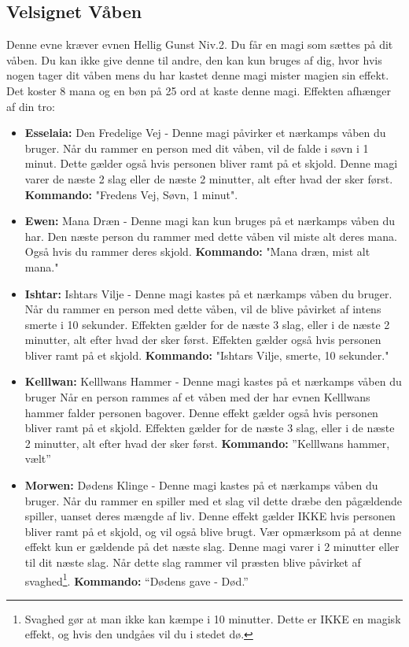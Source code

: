 \subsection{Velsignet Våben}
Denne evne kræver evnen Hellig Gunst Niv.2. 
Du får en magi som sættes på dit våben. Du kan ikke give denne til andre, den kan kun bruges af dig, hvor hvis nogen tager dit våben mens du har kastet denne magi mister magien sin effekt. Det koster 8 mana og en bøn på 25 ord at kaste denne magi. Effekten afhænger af din tro:
\begin{itemize}
    \item \textbf{Esselaia:} Den Fredelige Vej - Denne magi påvirker et nærkamps våben du bruger. Når du rammer en person med dit våben, vil de falde i søvn i 1 minut. Dette gælder også hvis personen bliver ramt på et skjold. Denne magi varer de næste 2 slag eller de næste 2 minutter, alt efter hvad der sker først. \textbf{Kommando:} "Fredens Vej, Søvn, 1 minut".
    \item \textbf{Ewen:} Mana Dræn - Denne magi kan kun bruges på et nærkamps våben du har. Den næste person du rammer med dette våben vil miste alt deres mana. Også hvis du rammer deres skjold. \textbf{Kommando:} "Mana dræn, mist alt mana."
    \item \textbf{Ishtar:} Ishtars Vilje - Denne magi kastes på et nærkamps våben du bruger. Når du rammer en person med dette våben, vil de blive påvirket af intens smerte i 10 sekunder. Effekten gælder for de næste 3 slag, eller i de næste 2 minutter, alt efter hvad der sker først. Effekten gælder også hvis personen bliver ramt på et skjold. \textbf{Kommando:} "Ishtars Vilje, smerte, 10 sekunder."
    \item \textbf{Kelllwan:} Kelllwans Hammer - Denne magi kastes på et nærkamps våben du bruger Når en person rammes af et våben med der har evnen Kelllwans hammer falder personen bagover. Denne effekt gælder også hvis personen bliver ramt på et skjold. Effekten gælder for de næste 3 slag, eller i de næste 2 minutter, alt efter hvad der sker først. \textbf{Kommando:} ”Kelllwans hammer, vælt”
    \item \textbf{Morwen:} Dødens Klinge - Denne magi kastes på et nærkamps våben du bruger. Når du rammer en spiller med et slag vil dette dræbe den pågældende spiller, uanset deres mængde af liv. Denne effekt gælder IKKE hvis personen bliver ramt på et skjold, og vil også blive brugt. Vær opmærksom på at denne effekt kun er gældende på det næste slag. Denne magi varer i 2 minutter eller til dit næste slag. Når dette slag rammer vil præsten blive påvirket af svaghed\footnote{Svaghed gør at man ikke kan kæmpe i 10 minutter. Dette er IKKE en magisk effekt, og hvis den undgåes vil du i stedet dø.}. \textbf{Kommando:} “Dødens gave - Død.”

\end{itemize}
